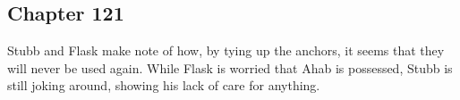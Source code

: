 \subsection{Chapter 121}

Stubb and Flask make note of how, by tying up the anchors, it seems that they
will never be used again. While Flask is worried that Ahab is possessed, Stubb
is still joking around, showing his lack of care for anything.
